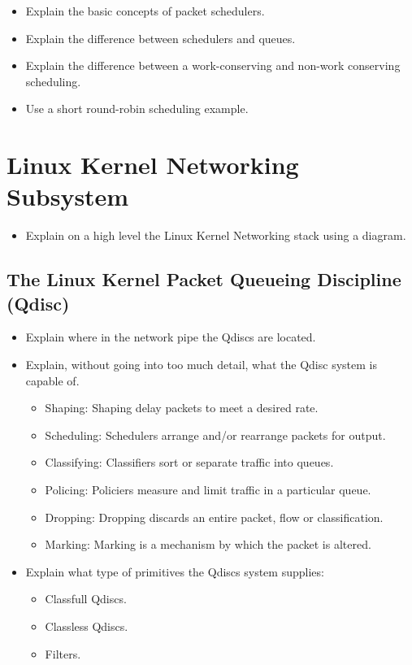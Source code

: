 \documentclass[sigconf, nonacm]{acmart}
\begin{document}

\begin{itemize}
  \item Explain the basic concepts of packet schedulers.
  \item Explain the difference between schedulers and queues.
  \item Explain the difference between a work-conserving and non-work conserving scheduling.
  \item Use a short round-robin scheduling example.
\end{itemize}

\section{Linux Kernel Networking Subsystem}

\begin{itemize}
  \item Explain on a high level the Linux Kernel Networking stack using a diagram.
\end{itemize}

\subsection{The Linux Kernel Packet Queueing Discipline (Qdisc)}

\begin{itemize}
  \item Explain where in the network pipe the Qdiscs are located.
  \item Explain, without going into too much detail, what the Qdisc system is capable of.
        \begin{itemize}
          \item Shaping: Shaping delay packets to meet a desired rate.
          \item Scheduling: Schedulers arrange and/or rearrange packets for output.
          \item Classifying: Classifiers sort or separate traffic into queues.
          \item Policing: Policiers measure and limit traffic in a particular queue.
          \item Dropping: Dropping discards an entire packet, flow or classification.
          \item Marking: Marking is a mechanism by which the packet is altered.
        \end{itemize}
  \item Explain what type of primitives the Qdiscs system supplies:
        \begin{itemize}
          \item Classfull Qdiscs.
          \item Classless Qdiscs.
          \item Filters.
        \end{itemize}
\end{itemize}
\end{document}
